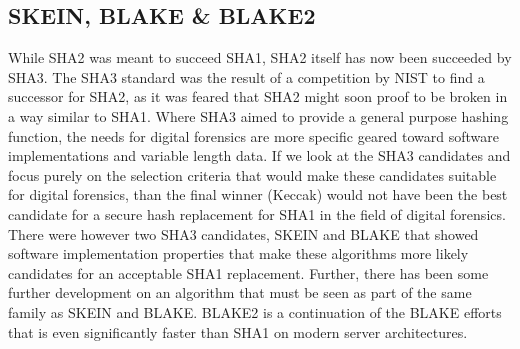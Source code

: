 \subsection{SKEIN, BLAKE \& BLAKE2}
While SHA2 was meant to succeed SHA1, SHA2 itself has now been succeeded by SHA3. The SHA3 standard was the result of a competition by NIST to find a successor for SHA2, as it was feared that SHA2 might soon proof to be broken in a way similar to SHA1. Where SHA3 aimed to provide a general purpose hashing function, the needs for digital forensics are more specific geared toward software implementations and variable length data. If we look at the SHA3 candidates and focus purely on the selection criteria that would make these candidates suitable for digital forensics, than the final winner (Keccak) would not have been the best candidate for a secure hash replacement for SHA1 in the field of digital forensics. There were however two SHA3 candidates, SKEIN and BLAKE that showed software implementation properties that make these algorithms more likely candidates for an acceptable SHA1 replacement. Further, there has been some further development on an algorithm that must be seen as part of the same family as SKEIN and BLAKE. BLAKE2 is a continuation of the BLAKE efforts that is even significantly faster than SHA1 on modern server architectures.
